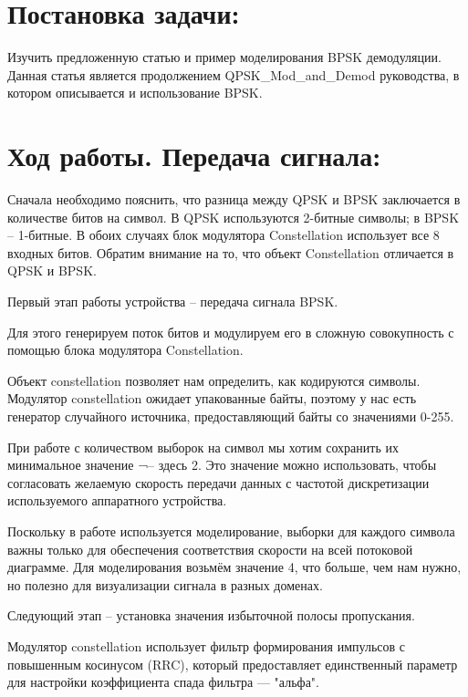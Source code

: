 \documentclass[12pt]{article}
\begin{document}
\begin{titlepage}
    
\end{titlepage}

\tableofcontents
\pagebreak

\section{Постановка задачи:}

Изучить предложенную статью и пример моделирования BPSK демодуляции. Данная статья является продолжением QPSK\_Mod\_and\_Demod руководства, в котором описывается и использование BPSK. 

\section{Ход работы. Передача сигнала:}

Сначала необходимо пояснить, что разница между QPSK и BPSK заключается в количестве битов на символ. В QPSK используются 2-битные символы; в BPSK – 1-битные. В обоих случаях блок модулятора Constellation использует все 8 входных битов. Обратим внимание на то, что объект Constellation отличается в QPSK и BPSK.

Первый этап работы устройства – передача сигнала BPSK. 

Для этого генерируем поток битов и модулируем его в сложную совокупность с помощью блока модулятора Constellation. 

Объект constellation позволяет нам определить, как кодируются символы. Модулятор constellation ожидает упакованные байты, поэтому у нас есть генератор случайного источника, предоставляющий байты со значениями 0-255.

При работе с количеством выборок на символ мы хотим сохранить их минимальное значение ¬– здесь 2. Это значение можно использовать, чтобы согласовать желаемую скорость передачи данных с частотой дискретизации используемого аппаратного устройства. 

Поскольку в работе используется моделирование, выборки для каждого символа важны только для обеспечения соответствия скорости на всей потоковой диаграмме. Для моделирования возьмём значение 4, что больше, чем нам нужно, но полезно для визуализации сигнала в разных доменах.

Следующий этап – установка значения избыточной полосы пропускания. 

Модулятор constellation использует фильтр формирования импульсов с повышенным косинусом (RRC), который предоставляет единственный параметр для настройки коэффициента спада фильтра --- "альфа". 
\end{document}
